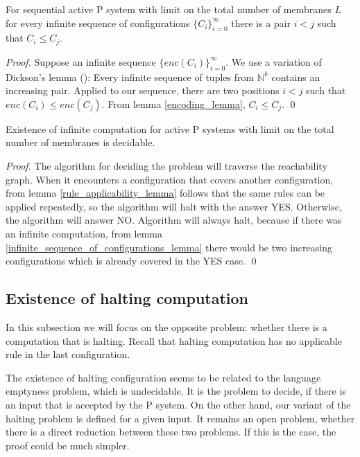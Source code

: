 \documentclass[llncs,submission,copyright,creativecommons]{../lib/lncs/llncs}
\begin{document}
\begin{lemma}
\label{infinite_sequence_of_configurations_lemma}
  For sequential active P system with limit on the total number of membranes $L$ for every infinite sequence of configurations $\{C_i\}_{i=0}^\infty$ there is a pair $i<j$ such that $C_i\leq C_j$.
\end{lemma}

\begin{proof}
  Suppose an infinite sequence $\{enc(C_i)\}_{i=0}^\infty$. We use a variation of Dickson's lemma (\cite{Figueira11Dickson}): Every infinite sequence of tuples from $\mathbb N^k$ contains an increasing pair. Applied to our sequence, there are two positions $i<j$ such that $enc(C_i)\leq enc(C_j)$. From lemma \ref{encoding_lemma}, $C_i\leq C_j$.
  \qed
\end{proof}

\begin{theorem}
  Existence of infinite computation for active P systems with limit on the total number of membranes is decidable.
\end{theorem}

\begin{proof}
  The algorithm for deciding the problem will traverse the reachability graph. When it encounters a configuration that covers another configuration, from lemma \ref{rule_applicability_lemma} follows that the same rules can be applied repeatedly, so the algorithm will halt with the answer YES.
  Otherwise, the algorithm will answer NO.
  Algorithm will always halt, because if there was an infinite computation, from lemma \ref{infinite_sequence_of_configurations_lemma} there would be two increasing configurations which is already covered in the YES case.
  \qed
\end{proof}


\subsection{Existence of halting computation} %
\label{sub:existence_of_halting_computation}

In this subsection we will focus on the opposite problem: whether there is a computation that is halting. Recall that halting computation has no applicable rule in the last configuration.

The existence of halting configuration seems to be related to the language emptyness problem, which is undecidable. It is the problem to decide, if there is an input that is accepted by the P system. On the other hand, our variant of the halting problem is defined for a given input. It remains an open problem, whether there is a direct reduction between these two problems. If this is the case, the proof could be much simpler.
\end{document}

